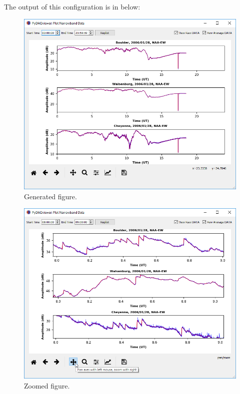 \documentclass[%
oneside,                 %
final,                   %
10pt]{article}
\begin{document}
The output of this configuration is in below:


\begin{figure}[!ht]  %
  \centerline{\includegraphics[width=1.0\linewidth]{imgs/LEPfigure1.png}}
  \caption{
  Generated figure. \label{fig:LEP_figure1}
  }
\end{figure}




\begin{figure}[!ht]  %
  \centerline{\includegraphics[width=1.0\linewidth]{imgs/LEPfigure2.png}}
  \caption{
  Zoomed figure. \label{fig:LEP_figure2}
  }
\end{figure}




\end{document}

